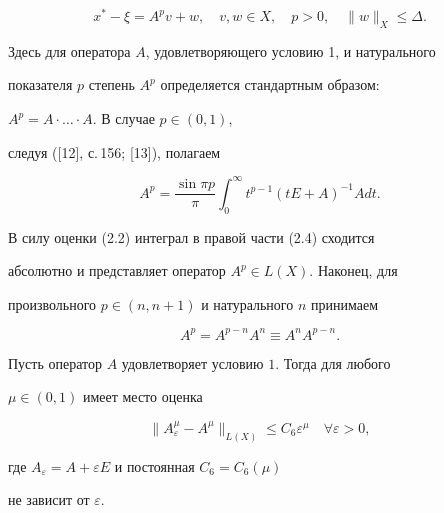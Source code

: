 \begin{equation}


x^{*}- \xi= A^p v + w,\quad v, w \in X,\quad p>0, \quad


\| w\|_X \leq \Delta.


\tag{2.3}


\end{equation}


Здесь для оператора $A$, удовлетворяющего условию 1, и натурального 


показателя $p$ степень $A^p$ определяется стандартным образом:


$A^p=A \cdot \dots \cdot A$. В случае $p \in (0,1)$,


следуя ([12], с.\,156; [13]), полагаем


\begin{equation}


A^p =\frac{\sin \pi p}{\pi}\int ^ \infty_0


t^{p-1}{(tE+A)}^{-1} A dt.\tag{2.4}


\end{equation}


В силу оценки (2.2) интеграл в правой части (2.4) сходится


абсолютно и представляет оператор $A^p \in L(X)$. Наконец, для


произвольного $p \in (n,n+1)$ и натурального $n$ принимаем


\begin{equation}


A^p=A^{p-n}A^n \equiv A^n A^{p-n}.\tag{2.5}


\end{equation}








\begin{lem}


Пусть оператор $A$ удовлетворяет условию $1$. Тогда для любого\linebreak


$\mu \in (0,1)$ имеет место оценка


$$


\| A^{\mu}_{\varepsilon}-A^{\mu} \|_{L(X)}


\leq C_6 {\varepsilon}^{\mu} \quad \forall \varepsilon >0,


$$


где $A_{\varepsilon}=A+ \varepsilon E$ и постоянная $C_6=C_6(\mu)$


не зависит от $\varepsilon$.


\end{lem}





